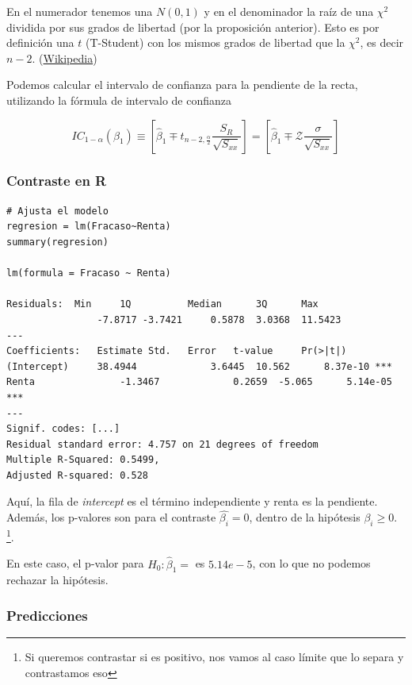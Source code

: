 En el numerador tenemos una $N(0,1)$ y en el denominador la raíz de una $\chi^2$ dividida por sus grados de libertad (por la proposición anterior). Esto es por definición una $t$ (T-Student) con los mismos grados de libertad que la $\chi^2$, es decir $n-2$. (\href{https://en.wikipedia.org/wiki/Student%27s\_t-distribution#Characterization}{Wikipedia})


\begin{prop}
Podemos calcular el intervalo de confianza  para la pendiente de la recta, utilizando la fórmula de intervalo de confianza

\[
IC_{1-α}(β_1) \equiv \left[ \hat{β}_1 \mp t_{n-2,\frac{α}{2}}\frac{S_R}{\sqrt{S_{xx}}}\right] = \left[ \hat{β}_1 \mp \mathcal{Z}\frac{σ}{\sqrt{S_{xx}}}\right] %
\]
\end{prop}

\subsubsection{Contraste en R}

\label{example:R-output}
\begin{lstlisting}[style=mystyle]
# Ajusta el modelo
regresion = lm(Fracaso~Renta)
summary(regresion)

lm(formula = Fracaso ~ Renta)

Residuals:	Min		1Q			Median		3Q		Max
				-7.8717 -3.7421		0.5878	3.0368	11.5423
---
Coefficients:	Estimate Std.	Error 	t-value		Pr(>|t|)
(Intercept)		38.4944				3.6445	10.562		8.37e-10 ***
Renta 				-1.3467				0.2659	-5.065		5.14e-05 ***
---
Signif. codes: [...]
Residual standard error: 4.757 on 21 degrees of freedom
Multiple R-Squared: 0.5499,
Adjusted R-squared: 0.528
\end{lstlisting}


Aquí, la fila de \textit{intercept} es el término independiente y renta es la pendiente. Además, los p-valores son para el contraste $\hat{β_i} = 0$, dentro de la hipótesis $β_i \geq 0$. \footnote{Si queremos contrastar si es positivo, nos vamos al caso límite que lo separa y contrastamos eso}.

En este caso, el p-valor para $H_0: \hat{β}_1=$ es $5.14e-5$, con lo que no podemos rechazar la hipótesis.


\subsubsection{Predicciones}

